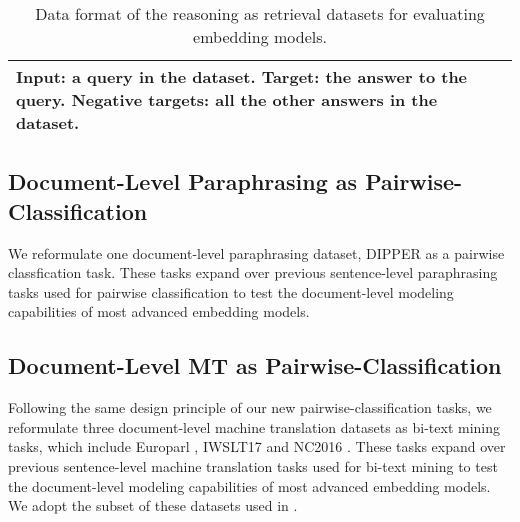 \begin{table*}[t!]
\centering
\small
\begin{tabular}{p{15.5cm}}
\toprule
\textbf{Input}: a query in the dataset. 
\textbf{Target}: the answer to the query. 
\textbf{Negative targets}: all the other answers in the dataset.  \\ 
\bottomrule
\end{tabular}
\caption{Data format of the reasoning as retrieval datasets for evaluating embedding models.}
\label{tab:reasoning-as-retrieval-example}
\end{table*}


\subsection{Document-Level Paraphrasing as Pairwise-Classification}
We reformulate one document-level paraphrasing dataset, DIPPER \citep{dipper} as a pairwise classfication task. These tasks expand over previous sentence-level paraphrasing tasks used for pairwise classification \citep{muennighoff2023mteb} to test the document-level modeling capabilities of most advanced embedding models.   

\subsection{Document-Level MT as Pairwise-Classification}
Following the same design principle of our new pairwise-classification tasks, we reformulate three document-level machine translation datasets as bi-text mining tasks, which include Europarl \citep{koehn-2005-europarl}, IWSLT17 \citep{cettolo-etal-iwslt17-overview} and NC2016 \citep{maruf-etal-2019-selective}. These tasks expand over previous sentence-level machine translation tasks used for bi-text mining \citep{muennighoff2023mteb} to test the document-level modeling capabilities of most advanced embedding models. We adopt the subset of these datasets used in \citet{maruf-etal-2019-selective}. 

